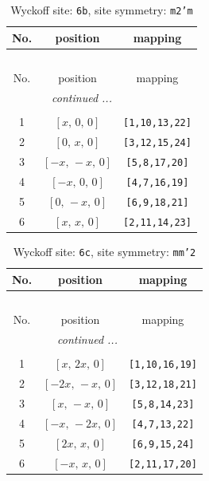 \documentclass[fleqn,8pt]{jsarticle}
\begin{document}
\begin{longtable}{ccc}
\caption{Wyckoff site: {\tt 6b}, site symmetry: {\tt m2'm}}
 \\
 \hline \hline
No. & position & mapping \\ \hline \endfirsthead

\multicolumn{2}{l}{\tablename\ \thetable{}} \\
 \hline \hline
No. & position & mapping \\ \hline \endhead

 \hline \hline
\multicolumn{2}{r}{\footnotesize\it continued ...} \\ \endfoot

 \hline \hline
\multicolumn{2}{r}{} \\ \endlastfoot

1 & $\left[ x,\, 0,\, 0 \right]$ & {\tt [1,10,13,22]} \\ \hline
2 & $\left[ 0,\, x,\, 0 \right]$ & {\tt [3,12,15,24]} \\ \hline
3 & $\left[ - x,\, - x,\, 0 \right]$ & {\tt [5,8,17,20]} \\ \hline
4 & $\left[ - x,\, 0,\, 0 \right]$ & {\tt [4,7,16,19]} \\ \hline
5 & $\left[ 0,\, - x,\, 0 \right]$ & {\tt [6,9,18,21]} \\ \hline
6 & $\left[ x,\, x,\, 0 \right]$ & {\tt [2,11,14,23]} \\
\end{longtable}
\renewcommand{\arraystretch}{1.2}
\begin{longtable}{ccc}
\caption{Wyckoff site: {\tt 6c}, site symmetry: {\tt mm'2}}
 \\
 \hline \hline
No. & position & mapping \\ \hline \endfirsthead

\multicolumn{2}{l}{\tablename\ \thetable{}} \\
 \hline \hline
No. & position & mapping \\ \hline \endhead

 \hline \hline
\multicolumn{2}{r}{\footnotesize\it continued ...} \\ \endfoot

 \hline \hline
\multicolumn{2}{r}{} \\ \endlastfoot

1 & $\left[ x,\, 2 x,\, 0 \right]$ & {\tt [1,10,16,19]} \\ \hline
2 & $\left[ - 2 x,\, - x,\, 0 \right]$ & {\tt [3,12,18,21]} \\ \hline
3 & $\left[ x,\, - x,\, 0 \right]$ & {\tt [5,8,14,23]} \\ \hline
4 & $\left[ - x,\, - 2 x,\, 0 \right]$ & {\tt [4,7,13,22]} \\ \hline
5 & $\left[ 2 x,\, x,\, 0 \right]$ & {\tt [6,9,15,24]} \\ \hline
6 & $\left[ - x,\, x,\, 0 \right]$ & {\tt [2,11,17,20]} \\
\end{longtable}
\end{document}

